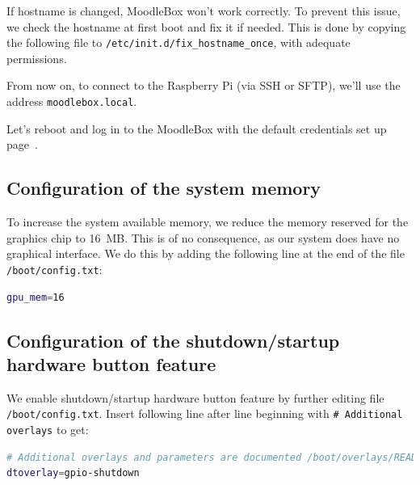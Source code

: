 \documentclass[12pt]{article}
\begin{document}
If hostname is changed, MoodleBox won't work correctly.
To prevent this issue, we check the hostname at first boot and fix it if needed.
This is done by copying the following file to \lstinline{/etc/init.d/fix_hostname_once}, with adequate permissions.



From now on, to connect to the Raspberry Pi (via SSH or SFTP), we'll use the address \lstinline{moodlebox.local}.

Let's reboot and log in to the MoodleBox with the default credentials set up page~\pageref{ssec-new-account}.

\subsection{Configuration of the system memory}

To increase the system available memory, we reduce the memory reserved for the graphics chip to 16~MB.
This is of no consequence, as our system does have no graphical interface.
We do this by adding the following line at the end of the file \lstinline{/boot/config.txt}:
\begin{lstlisting}[language=bash]
gpu_mem=16
\end{lstlisting}

\subsection{Configuration of the shutdown/startup hardware button feature}

We enable shutdown/startup hardware button feature by further editing file \lstinline{/boot/config.txt}.
Insert following line after line beginning with \lstinline{# Additional overlays} to get:
\begin{lstlisting}[language=bash]
# Additional overlays and parameters are documented /boot/overlays/README
dtoverlay=gpio-shutdown
\end{lstlisting}
\end{document}
